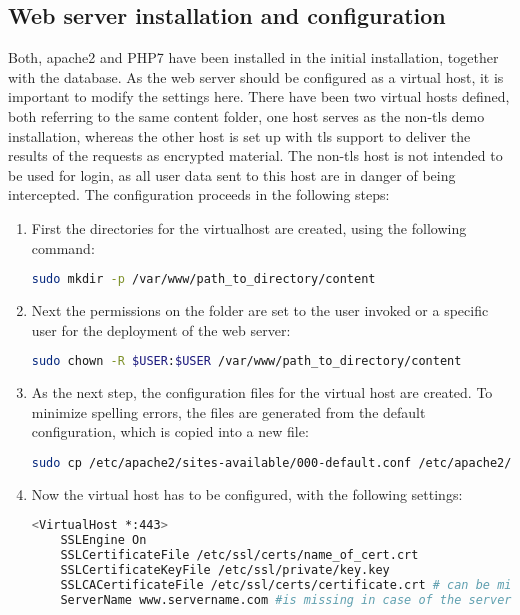 \subsection{Web server installation and configuration}
Both, apache2 and PHP7 have been installed in the initial installation, together with the database. As the web server should be configured as a virtual host, it is important to 
modify the settings here. There have been two virtual hosts defined, both referring to the same content folder, one host serves as the non-tls demo installation, whereas the other
host is set up with tls support to deliver the results of the requests as encrypted material. The non-tls host is not intended to be used for login, as all user data sent to this 
host are in danger of being intercepted. The configuration proceeds in the following steps:
\begin{enumerate}
 \item First the directories for the virtualhost are created, using the following command:
 \begin{lstlisting}[language=bash]
  sudo mkdir -p /var/www/path_to_directory/content
 \end{lstlisting}
 \item Next the permissions on the folder are set to the user invoked or a specific user for the deployment of the web server:
 \begin{lstlisting}[language=bash]
  sudo chown -R $USER:$USER /var/www/path_to_directory/content
 \end{lstlisting}
 \item As the next step, the configuration files for the virtual host are created. To minimize spelling errors, the files are generated from the default configuration, which is 
 copied into a new file:
 \begin{lstlisting}[language=bash]
  sudo cp /etc/apache2/sites-available/000-default.conf /etc/apache2/sites-available/name_virtual_host.conf
 \end{lstlisting}
 \item Now the virtual host has to be configured, with the following settings:
 \begin{lstlisting}[language=bash]
  <VirtualHost *:443>
	SSLEngine On
	SSLCertificateFile /etc/ssl/certs/name_of_cert.crt
	SSLCertificateKeyFile /etc/ssl/private/key.key
	SSLCACertificateFile /etc/ssl/certs/certificate.crt # can be missing, depending on tls configuration of the server
	ServerName www.servername.com #is missing in case of the server, to allow host resolution to the default virtual host and avoid DNS conflicts

\end{lstlisting}
\end{enumerate}
